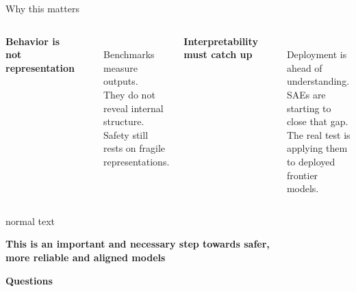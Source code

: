 \documentclass[aspectratio=169,11pt]{beamer}
\begin{document}
\begin{frame}{Why this matters}
  \vspace{0.1cm}
  \begin{columns}[T,totalwidth=\textwidth]
    \begin{minipage}[t][3.45cm][t]{\linewidth}
      {\large\color{ink}\textbf{Behavior is not representation}}\\[0.14cm]
      {\color{muted}\rule{\linewidth}{0.35pt}}\\[0.14cm]
      {\small\color{inktwo}
      Benchmarks measure outputs.\\[0.08cm]
      They do not reveal internal structure.\\[0.08cm]
      Safety still rests on fragile representations.}
    \end{minipage}

    \begin{minipage}[t][3.45cm][t]{\linewidth}
      {\large\color{ink}\textbf{Interpretability must catch up}}\\[0.14cm]
      {\color{muted}\rule{\linewidth}{0.35pt}}\\[0.14cm]
      {\small\color{inktwo}
      Deployment is ahead of understanding.\\[0.08cm]
      SAEs are starting to close that gap.\\[0.08cm]
      The real test is applying them to deployed frontier models.}
    \end{minipage}
  \end{columns}

  \vfill

  \begin{beamercolorbox}[wd=\linewidth,sep=0.26cm,rounded=true]{normal text}
    {\centering\normalsize\color{accent}\textbf{This is an important and necessary step towards safer,\\ more reliable and aligned models}\par}
  \end{beamercolorbox}
\end{frame}

\begin{frame}[plain]
  \vfill
  \begin{center}
    {\color{ink}\Huge\textbf{Questions}}
  \end{center}
  \vfill
\end{frame}
\end{document}
